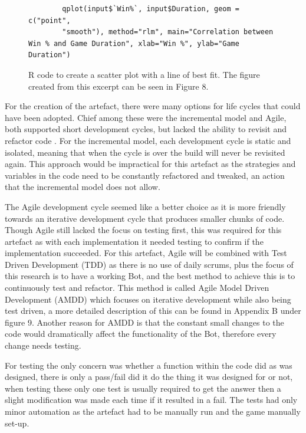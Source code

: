 \documentclass[journal]{IEEEtran}
\begin{document}
	\begin{figure}[H]
		\begin{lstlisting}
		qplot(input$`Win%`, input$Duration, geom = c("point",
		"smooth"), method="rlm", main="Correlation between Win % and Game Duration", xlab="Win %", ylab="Game Duration")
		\end{lstlisting}
		\caption{R code to create a scatter plot with a line of best fit. The figure created from this excerpt can be seen in Figure 8.}
		\label{Fig3}
	\end{figure}
	
	For the creation of the artefact, there were many options for life cycles that could have been adopted. Chief among these were the incremental model and Agile, both supported short development cycles, but lacked the ability to revisit and refactor code \cite{Life}. For the incremental model, each development cycle is static and isolated, meaning that when the cycle is over the build will never be revisited again. This approach would be impractical for this artefact as the strategies and variables in the code need to be constantly refactored and tweaked, an action that the incremental model does not allow.
	
	The Agile development cycle seemed like a better choice as it is more friendly towards an iterative development cycle that produces smaller chunks of code. Though Agile still lacked the focus on testing first, this was required for this artefact as with each implementation it needed testing to confirm if the implementation succeeded. For this artefact, Agile will be combined with Test Driven Development (TDD) as there is no use of daily scrums, plus the focus of this research is to have a working Bot, and the best method to achieve this is to continuously test and refactor. This method is called Agile Model Driven Development (AMDD) which focuses on iterative development while also being test driven, a more detailed description of this can be found in Appendix B under figure 9. Another reason for AMDD is that the constant small changes to the code would dramatically affect the functionality of the Bot, therefore every change needs testing.
	
	For testing the only concern was whether a function within the code did as was designed, there is only a pass/fail did it do the thing it was designed for or not, when testing these only one test is usually required to get the answer then a slight modification was made each time if it resulted in a fail. The tests had only minor automation as the artefact had to be manually run and the game manually set-up.
	\newline
	
\end{document}
